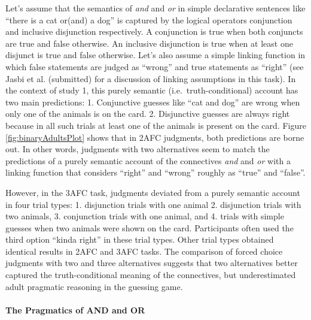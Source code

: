 \documentclass[man]{apa6}
\theoremstyle{definition}
\theoremstyle{definition}
\theoremstyle{definition}
\theoremstyle{remark}
\begin{document}
Let's assume that the semantics of \emph{and} and \emph{or} in simple
declarative sentences like \enquote{there is a cat or(and) a dog} is
captured by the logical operators conjunction and inclusive disjunction
respectively. A conjunction is true when both conjuncts are true and
false otherwise. An inclusive disjunction is true when at least one
disjunct is true and false otherwise. Let's also assume a simple linking
function in which false statements are judged as \enquote{wrong} and
true statements as \enquote{right} (see Jasbi et al. (submitted) for a
discussion of linking assumptions in this task). In the context of study
1, this purely semantic (i.e.~truth-conditional) account has two main
predictions: 1. Conjunctive guesses like \enquote{cat and dog} are wrong
when only one of the animals is on the card. 2. Disjunctive guesses are
always right because in all such trials at least one of the animals is
present on the card. Figure \ref{fig:binaryAdultsPlot} shows that in
2AFC judgments, both predictions are borne out. In other words,
judgments with two alternatives seem to match the predictions of a
purely semantic account of the connectives \emph{and} and \emph{or} with
a linking function that considers \enquote{right} and \enquote{wrong}
roughly as \enquote{true} and \enquote{false}.

However, in the 3AFC task, judgments deviated from a purely semantic
account in four trial types: 1. disjunction trials with one animal 2.
disjunction trials with two animals, 3. conjunction trials with one
animal, and 4. trials with simple guesses when two animals were shown on
the card. Participants often used the third option \enquote{kinda right}
in these trial types. Other trial types obtained identical results in
2AFC and 3AFC tasks. The comparison of forced choice judgments with two
and three alternatives suggests that two alternatives better captured
the truth-conditional meaning of the connectives, but underestimated
adult pragmatic reasoning in the guessing game.

\paragraph{The Pragmatics of AND and OR}\label{implicature}
\end{document}
